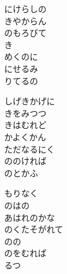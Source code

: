 \documentclass[10pt,b5j]{tarticle} %
\begin{document}
\vspace{1.5em} %
\newcommand{\linespace}{0.5em} %
\newcommand{\blocksize}{0.5\hsize} %
\begin{enumerate} %
    \begin{minipage}[c]{\blocksize}
    
        \vspace{\linespace}
        \item
        にけらしの\\
        きやからん\\
        のもろびて\\
        き\\
        めくのに\\
        にせるみ\\
        りてるの
        
        \vspace{\linespace}
        \item
        しげきかげに\\
        きをみつつ\\
        きはむれど\\
        かよくかん\\
        ただなるにく\\
        ののければ\\
        のとかふ
        
        \vspace{\linespace}
        \item
        もりなく\\
        のはの\\
        あはれのかな\\
        のくたそがれて\\
        のの\\
        のをむれば\\
        るつ
        

\end{minipage}
\end{enumerate}
\end{document}
